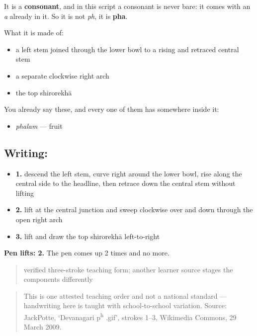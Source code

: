 It is a \textbf{consonant}, and in this script a consonant is never bare: it comes with an \emph{a} already in it. So it is not \emph{ph}, it is \textbf{pha}.

What it is made of:

\begin{itemize}
\raggedright
  \item a left stem joined through the lower bowl to a rising and retraced central stem
  \item a separate clockwise right arch
  \item the top shirorekhā
\end{itemize}

You already say these, and every one of them has  somewhere inside it:

\begin{itemize}
\raggedright
  \item \textbf{} \emph{phalam} — fruit
\end{itemize}

\subsection*{Writing: }

\begin{itemize}
\raggedright
  \item \textbf{1.} descend the left stem, curve right around the lower bowl, rise along the central side to the headline, then retrace down the central stem without lifting
  \item \textbf{2.} lift at the central junction and sweep clockwise over and down through the open right arch
  \item \textbf{3.} lift and draw the top shirorekhā left-to-right
\end{itemize}

\textbf{Pen lifts: 2.} The pen comes up 2 times and no more.

\begin{quote}
verified three-stroke teaching form; another learner source stages the components differently
\end{quote}

\begin{quote}
This is one attested teaching order and not a national standard — handwriting here is taught with school-to-school variation. Source: JackPotte, ‘Devanagari p\textsuperscript{h} .gif’, strokes 1–3, Wikimedia Commons, 29 March 2009.
\end{quote}

